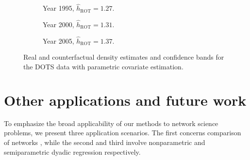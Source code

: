 \documentclass[11pt,lof]{puthesis}
\DeclareMathOperator{\ROT}{ROT}
\theoremstyle{break}
\theoremstyle{proof}
\begin{document}
\begin{figure}[t]
\centering
%
\begin{subfigure}{0.32\textwidth}
\centering
\caption{Year 1995, $\hat h_{\ROT} = 1.27$.}
\end{subfigure}
%
\begin{subfigure}{0.32\textwidth}
\centering
\caption{Year 2000, $\hat h_{\ROT} = 1.31$.}
\end{subfigure}
%
\begin{subfigure}{0.32\textwidth}
\centering
\caption{Year 2005, $\hat h_{\ROT} = 1.37$.}
\end{subfigure}
%
\caption[Parametric likelihood-based estimation and
inference for the DOTS data]{
Real and counterfactual density estimates and confidence bands for
the DOTS data with parametric covariate estimation.}
%
\label{fig:kernel_trade_para}
%
\end{figure}

\section{Other applications and future work}
\label{sec:kernel_future}

To emphasize the broad applicability of our methods to network science
problems, we present three application scenarios. The first concerns comparison
of networks \citep{kolaczyk2009statistical}, while the second and third involve
nonparametric and semiparametric dyadic regression respectively.
\end{document}
